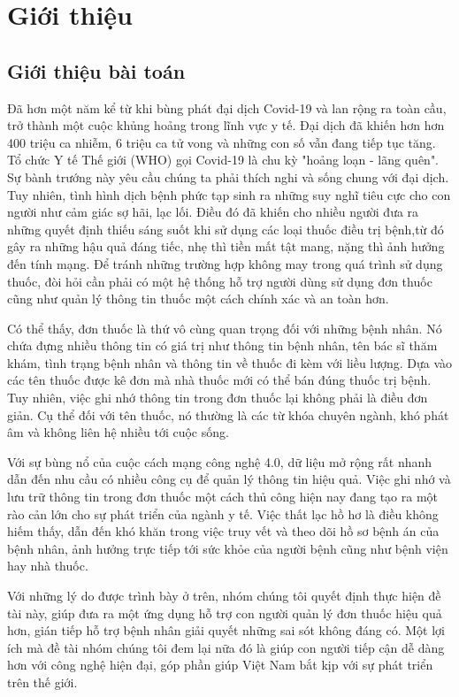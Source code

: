 \chapter{Giới thiệu}
\label{Chapter1}

\section{Giới thiệu bài toán}

Đã hơn một năm kể từ khi bùng phát đại dịch Covid-19 và lan rộng ra toàn cầu, trở thành
một cuộc khủng hoảng trong lĩnh vực y tế. Đại dịch đã khiến hơn hơn 400 triệu ca nhiễm, 6
triệu ca tử vong và những con số vẫn đang tiếp tục tăng. Tổ chức Y tế Thế giới (WHO) gọi
Covid-19 là chu kỳ "hoảng loạn - lãng quên". Sự bành trướng này yêu cầu chúng ta phải
thích nghi và sống chung với đại dịch. Tuy nhiên, tình hình dịch bệnh phức tạp sinh ra
những suy nghĩ tiêu cực cho con người như cảm giác sợ hãi, lạc lối. Điều đó đã khiến cho
nhiều người đưa ra những quyết định thiếu sáng suốt khi sử dụng các loại thuốc điều trị
bệnh,từ đó gây ra những hậu quả đáng tiếc, nhẹ thì tiền mất tật mang, nặng thì ảnh hưởng
đến tính mạng. Để tránh những trường hợp không may trong quá trình sử dụng thuốc, đòi
hỏi cần phải có một hệ thống hỗ trợ người dùng sử dụng đơn thuốc cũng như quản lý thông
tin thuốc một cách chính xác và an toàn hơn.

Có thể thấy, đơn thuốc là thứ vô cùng quan trọng đối với những bệnh nhân. Nó chứa đựng
nhiều thông tin có giá trị như thông tin bệnh nhân, tên bác sĩ thăm khám, tình trạng bệnh
nhân và thông tin về thuốc đi kèm với liều lượng. Dựa vào các tên thuốc được kê đơn mà
nhà thuốc mới có thể bán đúng thuốc trị bệnh. Tuy nhiên, việc ghi nhớ thông tin trong đơn thuốc lại không phải là điều đơn giản. Cụ thể đối với tên thuốc, nó thường là các từ khóa
chuyên ngành, khó phát âm và không liên hệ nhiều tới cuộc sống.

Với sự bùng nổ của cuộc cách mạng công nghệ 4.0, dữ liệu mở rộng rất nhanh dẫn đến nhu
cầu có nhiều công cụ để quản lý thông tin hiệu quả. Việc ghi nhớ và lưu trữ thông tin trong
đơn thuốc một cách thủ công hiện nay đang tạo ra một rào cản lớn cho sự phát triển của
ngành y tế. Việc thất lạc hồ hơ là điều không hiếm thấy, dẫn đến khó khăn trong việc truy vết
và theo dõi hồ sơ bệnh án của bệnh nhân, ảnh hưởng trực tiếp tới sức khỏe của người
bệnh cũng như bệnh viện hay nhà thuốc.

Với những lý do được trình bày ở trên, nhóm chúng tôi quyết định thực hiện đề tài này, giúp
đưa ra một ứng dụng hỗ trợ con người quản lý đơn thuốc hiệu quả hơn, gián tiếp hỗ trợ
bệnh nhân giải quyết những sai sót không đáng có. Một lợi ích mà đề tài nhóm chúng tôi
đem lại nữa đó là giúp con người tiếp cận dễ dàng hơn với công nghệ hiện đại, góp phần
giúp Việt Nam bắt kịp với sự phát triển trên thế giới.

